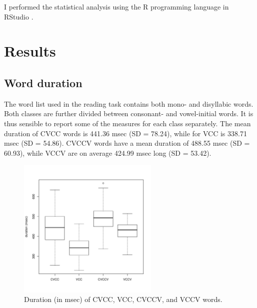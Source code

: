 \documentclass[11pt,a4paper,openany]{memoir}\usepackage[]{graphicx}\usepackage[]{color}
\newenvironment{knitrout}{}{} %
\begin{document}
I performed the statistical analysis using the R programming language \citep{r-core-team2015} in RStudio \citep{rstudio-team2015}.
















\chapter{Results}
\label{c:results}

\section{Word duration}


The word list used in the reading task contains both mono- and disyllabic words.
Both classes are further divided between consonant- and vowel-initial words.
It is thus sensible to report some of the measures for each class separately.
The mean duration of CVCC words is 441.36 msec (SD = 78.24), while for VCC is 338.71 msec (SD = 54.86).
CVCCV words have a mean duration of 488.55 msec (SD = 60.93), while VCCV are on average 424.99 msec long (SD = 53.42).

\begin{figure}
\centering
\begin{knitrout}
\color{fgcolor}
\includegraphics[width=0.6\textwidth]{img/word-duration-1} 

\end{knitrout}
\caption{Duration (in msec) of CVCC, VCC, CVCCV, and VCCV words.}
\label{f:worddur}
\end{figure}
\end{document}
